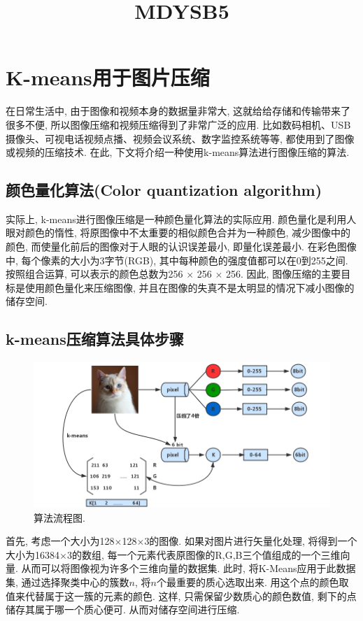 \documentclass[lang=cn,11pt]{elegantpaper}
\title{MDYSB5}
\date{}
\begin{document}
% 
\newpage
\maketitle

	
\tableofcontents
\thispagestyle{empty}
\newpage
\normalsize
{}

\section{K-means用于图片压缩}
在日常生活中, 由于图像和视频本身的数据量非常大, 这就给给存储和传输带来了很多不便, 所以图像压缩和视频压缩得到了非常广泛的应用. 比如数码相机、USB 摄像头、可视电话视频点播、视频会议系统、数字监控系统等等, 都使用到了图像或视频的压缩技术. 在此, 下文将介绍一种使用k-means算法进行图像压缩的算法. 
\subsection{颜色量化算法(Color quantization algorithm)}
实际上, k-means进行图像压缩是一种颜色量化算法的实际应用. 颜色量化是利用人眼对颜色的惰性, 将原图像中不太重要的相似颜色合并为一种颜色, 减少图像中的颜色, 而使量化前后的图像对于人眼的认识误差最小, 即量化误差最小. 在彩色图像中, 每个像素的大小为3字节(RGB), 其中每种颜色的强度值都可以在0到255之间. 按照组合运算, 可以表示的颜色总数为256 $\times$ 256 $\times$ 256. 因此, 图像压缩的主要目标是使用颜色量化来压缩图像, 并且在图像的失真不是太明显的情况下减小图像的储存空间. 
\subsection{k-means压缩算法具体步骤}
\begin{figure}[ht]
    \centering
    \includegraphics[width=.8\textwidth]{Flow}
    \caption{算法流程图. \label{fig:flow}}
\end{figure}
首先, 考虑一个大小为128$\times$128$\times$3的图像. 如果对图片进行矢量化处理, 将得到一个大小为16384$\times$3的数组, 每一个元素代表原图像的R,G,B三个值组成的一个三维向量. 从而可以将图像视为许多个三维向量的数据集. 此时, 将K-Means应用于此数据集, 通过选择聚类中心的簇数$n$, 将$n$个最重要的质心选取出来. 用这个点的颜色取值来代替属于这一簇的元素的颜色. 这样, 只需保留少数质心的颜色数值, 剩下的点储存其属于哪一个质心便可. 从而对储存空间进行压缩. 
\end{document}
